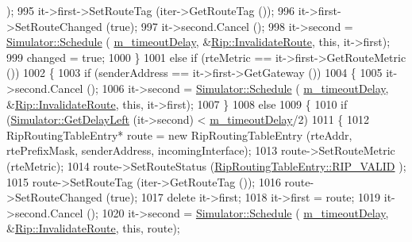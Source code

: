 \begin{DoxyCode}
      );
995                   it->first->SetRouteTag (iter->GetRouteTag ());
996                   it->first->SetRouteChanged (\textcolor{keyword}{true});
997                   it->second.Cancel ();
998                   it->second = \hyperlink{classns3_1_1Simulator_a671882c894a08af4a5e91181bf1eec13}{Simulator::Schedule} (
      \hyperlink{classns3_1_1Rip_a8a684a47271e0e382dd5f485a8a5545b}{m\_timeoutDelay}, &\hyperlink{classns3_1_1Rip_a48b295877e349360bf978c250ae59083}{Rip::InvalidateRoute}, \textcolor{keyword}{this}, it->first);
999                   changed = \textcolor{keyword}{true};
1000                 \}
1001               \textcolor{keywordflow}{else} \textcolor{keywordflow}{if} (rteMetric == it->first->GetRouteMetric ())
1002                 \{
1003                   \textcolor{keywordflow}{if} (senderAddress == it->first->GetGateway ())
1004                     \{
1005                       it->second.Cancel ();
1006                       it->second = \hyperlink{classns3_1_1Simulator_a671882c894a08af4a5e91181bf1eec13}{Simulator::Schedule} (
      \hyperlink{classns3_1_1Rip_a8a684a47271e0e382dd5f485a8a5545b}{m\_timeoutDelay}, &\hyperlink{classns3_1_1Rip_a48b295877e349360bf978c250ae59083}{Rip::InvalidateRoute}, \textcolor{keyword}{this}, it->first);
1007                     \}
1008                   \textcolor{keywordflow}{else}
1009                     \{
1010                       \textcolor{keywordflow}{if} (\hyperlink{classns3_1_1Simulator_af2c7b4285454aa5062bd2df2bb7a7ab9}{Simulator::GetDelayLeft} (it->second) < 
      \hyperlink{classns3_1_1Rip_a8a684a47271e0e382dd5f485a8a5545b}{m\_timeoutDelay}/2)
1011                         \{
1012                           RipRoutingTableEntry* route = \textcolor{keyword}{new} RipRoutingTableEntry (rteAddr, rtePrefixMask, 
      senderAddress, incomingInterface);
1013                           route->SetRouteMetric (rteMetric);
1014                           route->SetRouteStatus (\hyperlink{classns3_1_1RipRoutingTableEntry_a4326145be5c3027f2ddf9eb80b6127a4ac29e62da26c18bf4b9caa5224cfee895}{RipRoutingTableEntry::RIP\_VALID}
      );
1015                           route->SetRouteTag (iter->GetRouteTag ());
1016                           route->SetRouteChanged (\textcolor{keyword}{true});
1017                           \textcolor{keyword}{delete} it->first;
1018                           it->first = route;
1019                           it->second.Cancel ();
1020                           it->second = \hyperlink{classns3_1_1Simulator_a671882c894a08af4a5e91181bf1eec13}{Simulator::Schedule} (
      \hyperlink{classns3_1_1Rip_a8a684a47271e0e382dd5f485a8a5545b}{m\_timeoutDelay}, &\hyperlink{classns3_1_1Rip_a48b295877e349360bf978c250ae59083}{Rip::InvalidateRoute}, \textcolor{keyword}{this}, route);

\end{DoxyCode}
